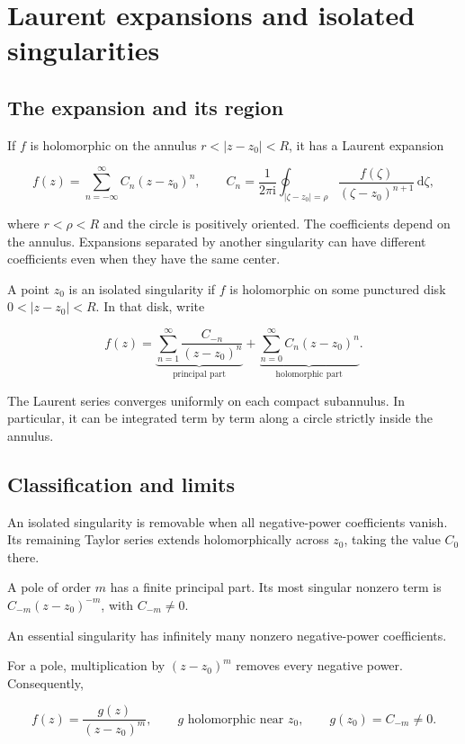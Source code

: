 \documentclass[11pt,a4paper]{article}
\theoremstyle{definition}
\theoremstyle{plain}
\begin{document}
\section{Laurent expansions and isolated singularities}

\subsection{The expansion and its region}

If $f$ is holomorphic on the annulus $r<|z-z_0|<R$, it has a Laurent expansion

\[
f(z)=\sum_{n=-\infty}^{\infty}C_n(z-z_0)^n,\qquad
C_n=\frac{1}{2\pi\mathrm{i}}\oint_{|\zeta-z_0|=\rho}
\frac{f(\zeta)}{(\zeta-z_0)^{n+1}}\,\mathrm{d}\zeta,
\]

where $r<\rho<R$ and the circle is positively oriented. The coefficients depend on the annulus. Expansions separated by another singularity can have different coefficients even when they have the same center.

A point $z_0$ is an isolated singularity if $f$ is holomorphic on some punctured disk $0<|z-z_0|<R$. In that disk, write

\[
f(z)=\underbrace{\sum_{n=1}^{\infty}\frac{C_{-n}}{(z-z_0)^n}}_{\text{principal part}}
+\underbrace{\sum_{n=0}^{\infty}C_n(z-z_0)^n}_{\text{holomorphic part}}.
\]

The Laurent series converges uniformly on each compact subannulus. In particular, it can be integrated term by term along a circle strictly inside the annulus.

\subsection{Classification and limits}

An isolated singularity is removable when all negative-power coefficients vanish. Its remaining Taylor series extends holomorphically across $z_0$, taking the value $C_0$ there.

A pole of order $m$ has a finite principal part. Its most singular nonzero term is $C_{-m}(z-z_0)^{-m}$, with $C_{-m}\ne0$.

An essential singularity has infinitely many nonzero negative-power coefficients.

For a pole, multiplication by $(z-z_0)^m$ removes every negative power. Consequently,

\[
f(z)=\frac{g(z)}{(z-z_0)^m},\qquad
g\text{ holomorphic near }z_0,\qquad g(z_0)=C_{-m}\ne0.
\]
\end{document}
